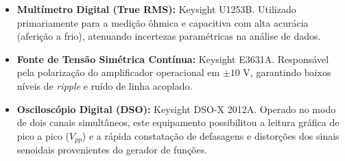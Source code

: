\begin{itemize}
	\item \textbf{Multímetro Digital (True RMS):} Keysight U1253B. Utilizado primariamente para a medição ôhmica e capacitiva com alta acurácia (aferição a frio), atenuando incertezas paramétricas na análise de dados.
	\item \textbf{Fonte de Tensão Simétrica Contínua:} Keysight E3631A. Responsável pela polarização do amplificador operacional em $\pm 10\text{ V}$, garantindo baixos níveis de \textit{ripple} e ruído de linha acoplado.
	\item \textbf{Osciloscópio Digital (DSO):} Keysight DSO-X 2012A. Operado no modo de dois canais simultâneos, este equipamento possibilitou a leitura gráfica de pico a pico ($V_{pp}$) e a rápida constatação de defasagens e distorções dos sinais senoidais provenientes do gerador de funções.
\end{itemize}